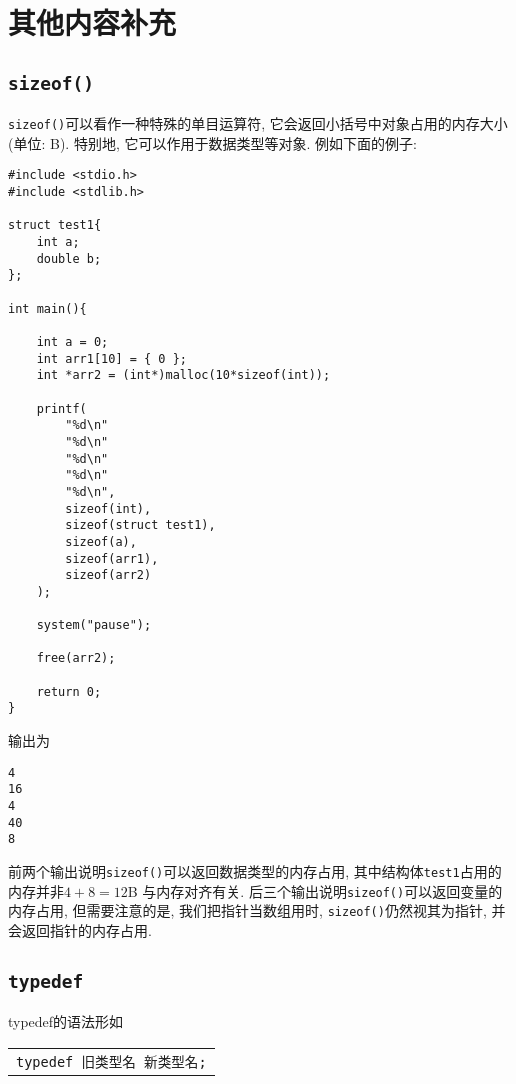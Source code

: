 \chapter{其他内容补充} \label{其他内容补充}
    \section{\texttt{sizeof()}} \label{sizeof}
        \texttt{sizeof()}可以看作一种特殊的单目运算符, 它会返回小括号中对象占用的内存大小(单位: B). 特别地, 它可以作用于数据类型等对象. 例如下面的例子:
\begin{lstlisting}
#include <stdio.h>
#include <stdlib.h>

struct test1{
    int a;
    double b;
};

int main(){

    int a = 0;
    int arr1[10] = { 0 };
    int *arr2 = (int*)malloc(10*sizeof(int));

    printf(
        "%d\n"
        "%d\n"
        "%d\n"
        "%d\n"
        "%d\n",
        sizeof(int),
        sizeof(struct test1),
        sizeof(a),
        sizeof(arr1),
        sizeof(arr2)
    );

    system("pause");

    free(arr2);

    return 0;
}
\end{lstlisting}

        输出为
\begin{lstlisting}
4
16
4
40
8
\end{lstlisting}

        前两个输出说明\texttt{sizeof()}可以返回数据类型的内存占用, 其中结构体\texttt{test1}占用的内存并非$4 + 8 = 12$B 与内存对齐有关. 后三个输出说明\texttt{sizeof()}可以返回变量的内存占用, 但需要注意的是, 我们把指针当数组用时, \texttt{sizeof()}仍然视其为指针, 并会返回指针的内存占用.

    \section{\texttt{typedef}}
        typedef的语法形如
        \begin{center}
        \begin{longtable}{l}
            \texttt{typedef 旧类型名~新类型名;}
        \end{longtable}
        \end{center}
        
